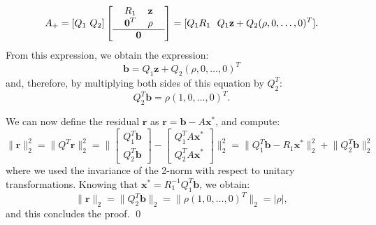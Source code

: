 \documentclass[a4paper,11pt]{article}
\begin{document}
\begin{equation}
	A_+ = [Q_1\ Q_2] \left[ \begin{tabular}{c}
		\begin{tabular}{cc}
			$R_1$& $\textbf{z}$ \\
			$\textbf{0}^T$& $\rho$ \\
		\end{tabular}\\
	\hline
		$\textbf{0}$
	\end{tabular}\right] = [Q_1 R_1\ \ Q_1 \textbf{z} + Q_2(\rho,0,\dots,0)^T  ].
\end{equation}
From this expression, we obtain the expression:
\begin{equation}\label{key}
	\textbf{b} = Q_1 \textbf{z} + Q_2(\rho,0,\dots,0)^T
\end{equation}
and, therefore, by multiplying both sides of this equation by $Q_2^T$:
\begin{equation}\label{key}
	Q_2^T \textbf{b} = \rho (1,0,\dots,0)^T.
\end{equation}

\noindent We can now define the residual $\textbf{r}$ as $\textbf{r} = \textbf{b} - A \textbf{x}^*$,
and compute:
\begin{equation}\label{key}
	\lVert \textbf{r} \rVert_2^2 = \lVert Q^T \textbf{r} \rVert_2^2 = \lVert \begin{bmatrix}
		Q_1^T \textbf{b}\\
		Q_2^T \textbf{b}
	\end{bmatrix} -\begin{bmatrix}
		Q_1^T A \textbf{x}^*\\
		Q_2^T A \textbf{x}^*
	\end{bmatrix} \rVert_2^2 = \lVert Q_1^T \textbf{b} - R_1 \textbf{x}^* \rVert_2^2 + \lVert Q_2^T \textbf{b} \rVert_2^2
\end{equation}
where we used the invariance of the 2-norm with respect to unitary transformations. Knowing that $\textbf{x}^* = R_1^{-1} Q_1^T \textbf{b}$, we obtain:
\begin{equation}\label{key}
	\lVert \textbf{r} \rVert_2 = \lVert Q_2^T \textbf{b} \rVert_2 = \lVert \rho (1,0,\dots,0)^T \rVert_2 = |\rho|,
\end{equation}
and this concludes the proof. \qed
\end{document}
